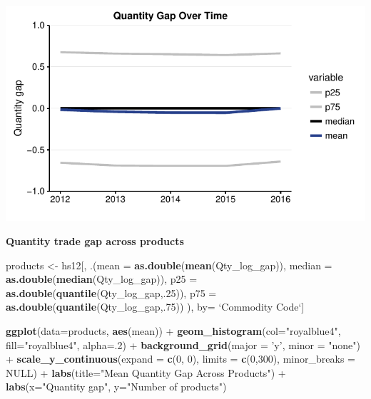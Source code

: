 \documentclass[10pt,]{article}
\newenvironment{Shaded}{\begin{snugshade}}{\end{snugshade}}
\newcommand{\KeywordTok}[1]{\textcolor[rgb]{0.13,0.29,0.53}{\textbf{{#1}}}}
\newcommand{\DataTypeTok}[1]{\textcolor[rgb]{0.13,0.29,0.53}{{#1}}}
\newcommand{\DecValTok}[1]{\textcolor[rgb]{0.00,0.00,0.81}{{#1}}}
\newcommand{\StringTok}[1]{\textcolor[rgb]{0.31,0.60,0.02}{{#1}}}
\newcommand{\OtherTok}[1]{\textcolor[rgb]{0.56,0.35,0.01}{{#1}}}
\newcommand{\NormalTok}[1]{{#1}}
\begin{document}
\begin{center}\includegraphics{Figs/quantity_time-1} \end{center}

\textbf{Quantity trade gap across products}

\begin{Shaded}
\begin{Highlighting}[]
\NormalTok{products <-}\StringTok{ }\NormalTok{hs12[, .(}\DataTypeTok{mean =} \KeywordTok{as.double}\NormalTok{(}\KeywordTok{mean}\NormalTok{(Qty_log_gap)),}
                     \DataTypeTok{median =} \KeywordTok{as.double}\NormalTok{(}\KeywordTok{median}\NormalTok{(Qty_log_gap)),}
                     \DataTypeTok{p25 =} \KeywordTok{as.double}\NormalTok{(}\KeywordTok{quantile}\NormalTok{(Qty_log_gap,.}\DecValTok{25}\NormalTok{)),}
                     \DataTypeTok{p75 =} \KeywordTok{as.double}\NormalTok{(}\KeywordTok{quantile}\NormalTok{(Qty_log_gap,.}\DecValTok{75}\NormalTok{))}
\NormalTok{),}
\NormalTok{by=}\StringTok{ `}\DataTypeTok{Commodity Code}\StringTok{`}\NormalTok{]}

\KeywordTok{ggplot}\NormalTok{(}\DataTypeTok{data=}\NormalTok{products, }\KeywordTok{aes}\NormalTok{(mean)) +}
\StringTok{  }\KeywordTok{geom_histogram}\NormalTok{(}\DataTypeTok{col=}\StringTok{"royalblue4"}\NormalTok{,}
                 \DataTypeTok{fill=}\StringTok{"royalblue4"}\NormalTok{,}
                 \DataTypeTok{alpha=}\NormalTok{.}\DecValTok{2}\NormalTok{) +}
\StringTok{  }\KeywordTok{background_grid}\NormalTok{(}\DataTypeTok{major =} \StringTok{'y'}\NormalTok{, }\DataTypeTok{minor =} \StringTok{"none"}\NormalTok{) +}
\StringTok{  }\KeywordTok{scale_y_continuous}\NormalTok{(}\DataTypeTok{expand =} \KeywordTok{c}\NormalTok{(}\DecValTok{0}\NormalTok{, }\DecValTok{0}\NormalTok{), }\DataTypeTok{limits =} \KeywordTok{c}\NormalTok{(}\DecValTok{0}\NormalTok{,}\DecValTok{300}\NormalTok{), }\DataTypeTok{minor_breaks =} \OtherTok{NULL}\NormalTok{) +}
\StringTok{  }\KeywordTok{labs}\NormalTok{(}\DataTypeTok{title=}\StringTok{"Mean Quantity Gap Across Products"}\NormalTok{) +}
\StringTok{  }\KeywordTok{labs}\NormalTok{(}\DataTypeTok{x=}\StringTok{"Quantity gap"}\NormalTok{, }\DataTypeTok{y=}\StringTok{"Number of products"}\NormalTok{)}
\end{Highlighting}
\end{Shaded}
\end{document}
